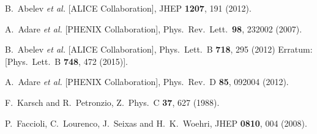 \documentclass[twocolumn,aps,superscriptaddress,showpacs,nofootinbib,floatfix]{revtex4}
\begin{document}
\begin{thebibliography}{99}
  B.~Abelev {\it et al.} [ALICE Collaboration],
  JHEP {\bf 1207}, 191 (2012).

  A.~Adare {\it et al.} [PHENIX Collaboration],
  Phys.\ Rev.\ Lett.\  {\bf 98}, 232002 (2007).

  B.~Abelev {\it et al.} [ALICE Collaboration],
  Phys.\ Lett.\ B {\bf 718}, 295 (2012)
  Erratum: [Phys.\ Lett.\ B {\bf 748}, 472 (2015)].

  A.~Adare {\it et al.} [PHENIX Collaboration],
  Phys.\ Rev.\ D {\bf 85}, 092004 (2012).

  F.~Karsch and R.~Petronzio,
  Z.\ Phys.\ C {\bf 37}, 627 (1988).

  P.~Faccioli, C.~Lourenco, J.~Seixas and H.~K.~Woehri,
  JHEP {\bf 0810}, 004 (2008).


\end{thebibliography}
\end{document}
